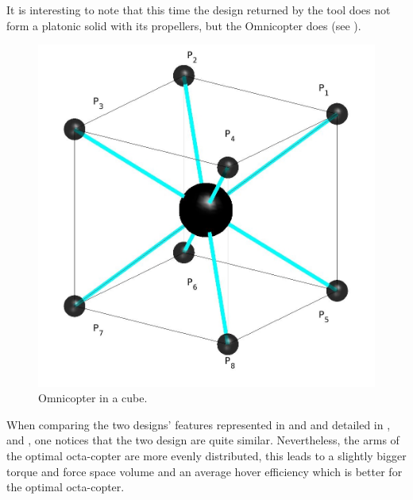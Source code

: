 It is interesting to note that this time the design returned by the tool does not
form a platonic solid with its propellers, but the Omnicopter does (see
).

\begin{figure}[!ht]
  \centering
  \includegraphics[width=0.5\linewidth]{images/Octa_cube.jpg}
  \caption{Omnicopter in a cube.} \label{fig:Octacopter_resultc}
\end{figure}

When comparing the two designs’ features represented in 
and  and detailed in ,
 and , one
notices that the two design are quite similar. Nevertheless, the arms of the optimal octa-copter
are more evenly distributed, this leads to a slightly bigger torque and force space volume
and an average hover efficiency which is better for the optimal octa-copter.\\\\\\\\


